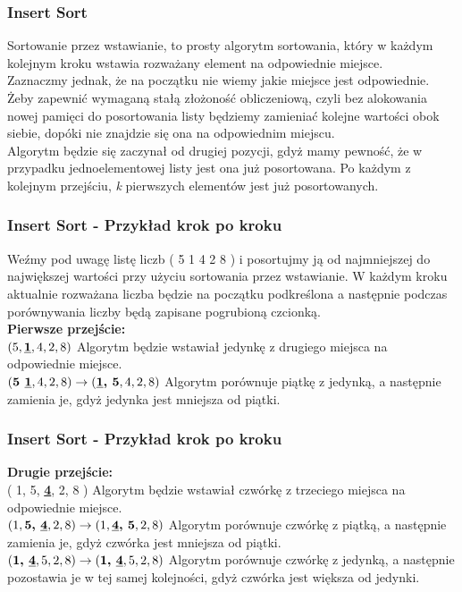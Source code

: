 \documentclass[kslide.tex]{subfiles}
\begin{document}
\frame{\titlepage}

\begin{frame}
\frametitle{Insert Sort}
Sortowanie przez wstawianie, to prosty algorytm sortowania, który w każdym kolejnym kroku wstawia rozważany element na odpowiednie miejsce.\\[0.3cm]
\pause
 Zaznaczmy jednak, że na początku nie wiemy jakie miejsce jest odpowiednie. Żeby zapewnić wymaganą stałą złożoność obliczeniową, czyli bez alokowania nowej pamięci do posortowania listy będziemy zamieniać kolejne wartości obok siebie, dopóki nie znajdzie się ona na odpowiednim miejscu. \\[0.3cm]
\pause
Algorytm będzie się zaczynał od drugiej pozycji, gdyż mamy pewność, że w przypadku jednoelementowej listy jest ona już posortowana. Po każdym z kolejnym przejściu, \textit{k} pierwszych elementów jest już posortowanych.
\end{frame}

\begin{frame}
\frametitle{Insert Sort - Przykład krok po kroku}
Weźmy pod uwagę listę liczb ( 5 1 4 2 8 ) i posortujmy ją od najmniejszej do największej wartości przy użyciu sortowania przez wstawianie. W każdym kroku aktualnie rozważana liczba będzie na początku podkreślona a następnie podczas porównywania liczby będą zapisane pogrubioną czcionką.\\[0.3cm]\pause
\textbf{Pierwsze przejście:}\\[0.1cm]
        $( 5, \textbf{\underline{1}}, 4, 2, 8 )$ Algorytm będzie wstawiał jedynkę z drugiego miejsca na odpowiednie miejsce.\\[0.1cm]
        $( \textbf{5 \underline{1}}, 4, 2, 8 ) \rightarrow ( \textbf{\underline{1}, 5}, 4, 2, 8 )$ Algorytm porównuje piątkę z jedynką, a następnie zamienia je, gdyż jedynka jest mniejsza od piątki.\\[0.1cm]
\end{frame}

\begin{frame}
\frametitle{Insert Sort - Przykład krok po kroku}
\textbf{Drugie przejście:}\\[0.1cm]
       ( 1, 5, \textbf{\underline{4}}, 2, 8 ) Algorytm będzie wstawiał czwórkę z trzeciego miejsca na odpowiednie miejsce.\\[0.1cm]
        $( 1, \textbf{5, \underline{4}}, 2, 8 ) \rightarrow ( 1, \textbf{\underline{4}, 5}, 2, 8 )$ Algorytm porównuje czwórkę z piątką, a następnie zamienia je, gdyż czwórka jest mniejsza od piątki.\\[0.1cm]
        $ ( \textbf{1, \underline{4}}, 5, 2, 8 ) \rightarrow ( \textbf{1, \underline{4}}, 5, 2, 8 )$ Algorytm porównuje czwórkę z jedynką, a następnie pozostawia je w tej samej kolejności, gdyż czwórka jest większa od jedynki.\\[0.1cm]
\end{frame}
\end{document}
